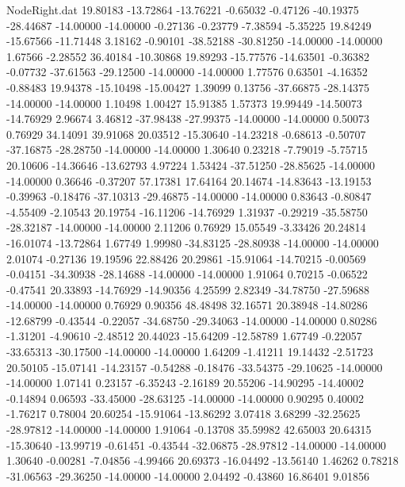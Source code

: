 \begin{filecontents}{NodeRight.dat}
  19.80183  -13.72864  -13.76221    -0.65032   -0.47126  -40.19375  -28.44687  -14.00000  -14.00000   -0.27136   -0.23779   -7.38594   -5.35225
  19.84249  -15.67566  -11.71448     3.18162   -0.90101  -38.52188  -30.81250  -14.00000  -14.00000    1.67566   -2.28552   36.40184  -10.30868
  19.89293  -15.77576  -14.63501    -0.36382   -0.07732  -37.61563  -29.12500  -14.00000  -14.00000    1.77576    0.63501   -4.16352   -0.88483
  19.94378  -15.10498  -15.00427     1.39099    0.13756  -37.66875  -28.14375  -14.00000  -14.00000    1.10498    1.00427   15.91385    1.57373
  19.99449  -14.50073  -14.76929     2.96674    3.46812  -37.98438  -27.99375  -14.00000  -14.00000    0.50073    0.76929   34.14091   39.91068
  20.03512  -15.30640  -14.23218    -0.68613   -0.50707  -37.16875  -28.28750  -14.00000  -14.00000    1.30640    0.23218   -7.79019   -5.75715
  20.10606  -14.36646  -13.62793     4.97224    1.53424  -37.51250  -28.85625  -14.00000  -14.00000    0.36646   -0.37207   57.17381   17.64164
  20.14674  -14.83643  -13.19153    -0.39963   -0.18476  -37.10313  -29.46875  -14.00000  -14.00000    0.83643   -0.80847   -4.55409   -2.10543
  20.19754  -16.11206  -14.76929     1.31937   -0.29219  -35.58750  -28.32187  -14.00000  -14.00000    2.11206    0.76929   15.05549   -3.33426
  20.24814  -16.01074  -13.72864     1.67749    1.99980  -34.83125  -28.80938  -14.00000  -14.00000    2.01074   -0.27136   19.19596   22.88426
  20.29861  -15.91064  -14.70215    -0.00569   -0.04151  -34.30938  -28.14688  -14.00000  -14.00000    1.91064    0.70215   -0.06522   -0.47541
  20.33893  -14.76929  -14.90356     4.25599    2.82349  -34.78750  -27.59688  -14.00000  -14.00000    0.76929    0.90356   48.48498   32.16571
  20.38948  -14.80286  -12.68799    -0.43544   -0.22057  -34.68750  -29.34063  -14.00000  -14.00000    0.80286   -1.31201   -4.90610   -2.48512
  20.44023  -15.64209  -12.58789     1.67749   -0.22057  -33.65313  -30.17500  -14.00000  -14.00000    1.64209   -1.41211   19.14432   -2.51723
  20.50105  -15.07141  -14.23157    -0.54288   -0.18476  -33.54375  -29.10625  -14.00000  -14.00000    1.07141    0.23157   -6.35243   -2.16189
  20.55206  -14.90295  -14.40002    -0.14894    0.06593  -33.45000  -28.63125  -14.00000  -14.00000    0.90295    0.40002   -1.76217    0.78004
  20.60254  -15.91064  -13.86292     3.07418    3.68299  -32.25625  -28.97812  -14.00000  -14.00000    1.91064   -0.13708   35.59982   42.65003
  20.64315  -15.30640  -13.99719    -0.61451   -0.43544  -32.06875  -28.97812  -14.00000  -14.00000    1.30640   -0.00281   -7.04856   -4.99466
  20.69373  -16.04492  -13.56140     1.46262    0.78218  -31.06563  -29.36250  -14.00000  -14.00000    2.04492   -0.43860   16.86401    9.01856

\end{filecontents}
